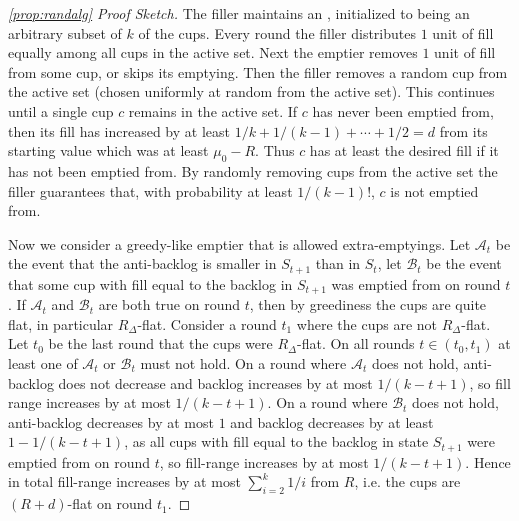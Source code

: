 \begin{proof}[\cref{prop:randalg} Proof Sketch]
  The filler maintains an , initialized to being
  an arbitrary subset of $k$ of the cups. Every round the filler
  distributes $1$ unit of fill equally among all cups in the
  active set. Next the emptier removes $1$ unit of fill from some
  cup, or skips its emptying. Then the filler removes a random
  cup from the active set (chosen uniformly at random from the
  active set). This continues until a single cup $c$ remains in
  the active set. 
  If $c$ has never been emptied from, then its fill has increased
  by at least $1/k + 1/(k-1) + \cdots + 1/2 = d$
  from its starting value which was at least $\mu_0 -R$. Thus $c$
  has at least the desired fill if it has not been emptied from.
  By randomly removing cups from the active set the filler
  guarantees that, with probability at least $1/(k-1)!$, $c$ is not
  emptied from.

  Now we consider a greedy-like emptier that is allowed
  extra-emptyings. Let $\mathcal{A}_t$ be the event that the
  anti-backlog is smaller in $S_{t+1}$ than in $S_t$, let
  $\mathcal{B}_t$ be the event that some cup with fill equal to
  the backlog in $S_{t+1}$ was emptied from on round $t$. If
  $\mathcal{A}_t$ and $\mathcal{B}_t$ are both true on round $t$,
  then by greediness the cups are quite flat, in particular
  $R_\Delta$-flat. Consider a round $t_1$ where the cups are not
  $R_\Delta$-flat. Let $t_0$ be the last round that the cups were
  $R_\Delta$-flat. On all rounds $t \in (t_0, t_1)$ at least one
  of $\mathcal{A}_t$ or $\mathcal{B}_t$ must not hold. On a round
  where $\mathcal{A}_t$ does not hold, anti-backlog does not
  decrease and backlog increases by at most $1/(k-t+1)$, so fill
  range increases by at most $1/(k-t+1).$ On a round where
  $\mathcal{B}_t$ does not hold, anti-backlog decreases by at
  most $1$ and backlog decreases by at least $1-1/(k-t+1)$, as
  all cups with fill equal to the backlog in state $S_{t+1}$ were
  emptied from on round $t$, so fill-range increases by at most
  $1/(k-t+1)$. 
  Hence in total fill-range increases by at most $\sum_{i=2}^k
  1/i$ from $R$, i.e. the cups are $(R+d)$-flat on round $t_1$.

\end{proof}

